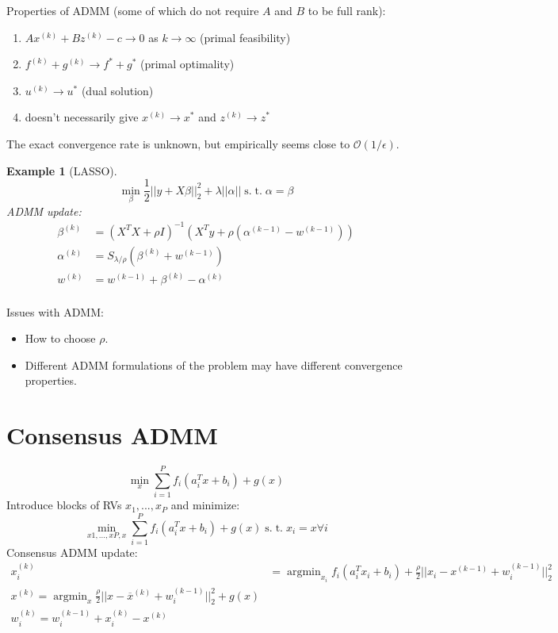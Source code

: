 \documentclass[10pt]{article}
\newtheorem{example}[ex]{Example}
\DeclareMathOperator*{\argmin}{argmin}
\renewcommand{\O}{\ensuremath{\mathcal{O}}}
\newcommand{\st}{\ensuremath{\;\mathrm{s.}\;\mathrm{t.}\;}}
\begin{document}
Properties of ADMM (some of which do not require $A$ and $B$ to be full rank):
\begin{enumerate}
  \item $Ax^{(k)}+Bz^{(k)}-c\to 0$ as $k\to\infty$ (primal feasibility)
\item $f^{(k)}+g^{(k)}\to f^*+g^*$ (primal optimality)
\item $u^{(k)}\to u^*$ (dual solution)
\item doesn't necessarily give $x^{(k)}\to x^*$ and $z^{(k)}\to z^*$
\end{enumerate}

The exact convergence rate is unknown, but empirically seems close to $\O(1/\epsilon)$.

\begin{example}[LASSO]
\[  \min_\beta \frac{1}{2}||y+X\beta||_2^2+\lambda||\alpha|| \st \alpha=\beta \]
ADMM update:
\begin{align*} %
  \beta^{(k)}&=(X^TX+\rho I)^{-1}(X^Ty+\rho(\alpha^{(k-1)}-w^{(k-1)}))\\ 
  \alpha^{(k)}&=S_{\lambda/\rho}(\beta^{(k)}+w^{(k-1)})\\
  w^{(k)}&=w^{(k-1)}+\beta^{(k)}-\alpha^{(k)}\\
\end{align*}
\end{example}
Issues with ADMM:
\begin{itemize}
\item How to choose $\rho$.
\item Different ADMM formulations of the problem may have different convergence properties.
  \end{itemize}

\section{Consensus ADMM}
\[ \min_x\sum_{i=1}^Pf_i(a_i^Tx+b_i)+g(x) \]
Introduce blocks of RVs $x_1,...,x_P$ and minimize: \[\min_{x1,...,xP,x}\sum_{i=1}^Pf_i(a_i^Tx+b_i)+g(x)\st x_i=x\forall i\]
Consensus ADMM update:
\begin{align*}
  x_i^{(k)}&=\argmin_{x_i}f_i(a_i^Tx_i+b_i)+\frac{\rho}{2}||x_i-x^{(k-1)}+w_i^{(k-1)}||_2^2\\
x^{(k)}=\argmin_{x}\frac{\rho}{2}||x-\overline{x}^{(k)}+w_i^{(k-1)}||_2^2 + g(x)\\
w_i^{(k)}=w_i^{(k-1)}+x_i^{(k)}-x^{(k)}\\
\end{align*}
\end{document}
